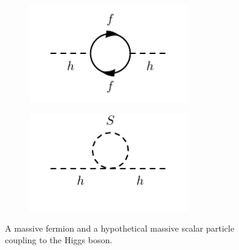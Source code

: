 \begin{figure}
	\centering
	\begin{subfigure}[b]{0.5\linewidth}
		\centering\includegraphics[width=0.75\textwidth]{fermion_loop}
		\caption{\label{fig:fermion_loop}}
	\end{subfigure}%
	\begin{subfigure}[b]{0.5\linewidth}
		\centering\includegraphics[width=0.75\textwidth]{scalar_loop}
		\caption{\label{fig:scal_loop}}
	\end{subfigure}	
	\caption{A massive fermion  and a hypothetical massive scalar particle  coupling to the Higgs boson.}\label{fig:loop_corrections_higgs}
\end{figure}



